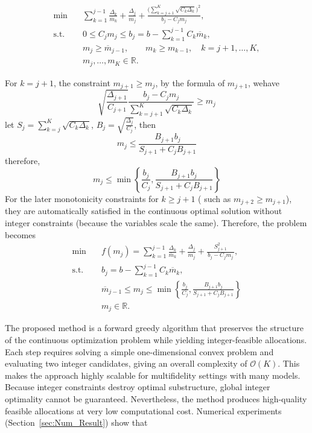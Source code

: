 %
\begin{subequations}\label{eq:Adaptive_Optimization}
\begin{align}
    \min \quad & \sum_{k=1}^{j-1}\frac{\Delta_k}{\overline{m}_k}
    + \frac{\Delta_j}{m_j}
    + \frac{\Big(\sum_{k=j+1}^K \sqrt{C_k\Delta_k}\Big)^2}
    {\,b_j - C_j m_j\,},\\
    \text{s.t.} \quad & 0\le C_j m_j \le b_j=b - \sum_{k=1}^{j-1} C_k\overline{m}_k, \\
    & m_j \ge \overline{m}_{j-1},\qquad m_k \ge m_{k-1}, \quad k=j+1,\ldots,K, \label{eq:Adaptive_Optimization_obj_c}\\
    & m_j,\ldots,m_K \in \mathbb{R}.
\end{align}
\end{subequations}
%

For $k=j+1$, the constraint $m_{j+1}\ge m_j$, by the formula of $m_{j+1}$, wehave
\[
\sqrt{\frac{\Delta_{j+1}}{C_{j+1}}}\frac{b_j-C_jm_j}{\sum_{k=j+1}^K\sqrt{C_k\Delta_k}}\ge m_j
\]
let $S_j = \sum_{k=j}^K \sqrt{C_k\Delta_k}$, $B_j = \sqrt{\frac{\Delta_j}{C_j}}$, then
\[
m_j\le \frac{B_{j+1}b_j}{S_{j+1}+C_jB_{j+1}}
\]
therefore, 
\[
m_j\le \min\left\{\frac{b_j}{C_j}, \frac{B_{j+1}b_j}{S_{j+1}+C_jB_{j+1}}\right\}
\]
For the later monotonicity constraints for $k\ge j+1$ ( such as $m_{j+2}\ge m_{j+1}$), they are automatically satisfied in the continuous optimal solution without integer constraints (because the variables scale the same). Therefore, the problem becomes
%
\begin{subequations}\label{eq:Adaptive_Optimization}
\begin{align}
    \min \quad & f(m_j) = \sum_{k=1}^{j-1}\frac{\Delta_k}{\overline{m}_k}
    + \frac{\Delta_j}{m_j}
    + \frac{S_{j+1}^2}
    {\,b_j - C_j m_j\,},\\
    \text{s.t.} \quad & b_j=b - \sum_{k=1}^{j-1} C_k\overline{m}_k, \\
    & \overline{m}_{j-1}\le m_j \le \min\left\{\frac{b_j}{C_j}, \frac{B_{j+1}b_j}{S_{j+1}+C_jB_{j+1}}\right\} \\
    & m_j\in \mathbb{R}.
\end{align}
\end{subequations}
%


The proposed method is a forward greedy algorithm that preserves the structure of the continuous optimization problem while yielding integer-feasible allocations. Each step requires solving a simple one-dimensional convex problem and evaluating two integer candidates, giving an overall complexity of $\mathcal{O}(K)$. This makes the approach highly scalable for multifidelity settings with many models. Because integer constraints destroy optimal substructure, global integer optimality cannot be guaranteed. Nevertheless, the method produces high-quality feasible allocations at very low computational cost. Numerical experiments (Section~\ref{sec:Num_Result}) show that 





